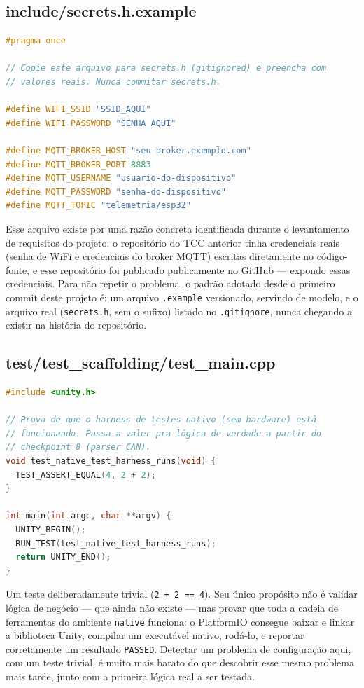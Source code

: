 \documentclass[11pt,a4paper]{article}
\begin{document}
\subsection{include/secrets.h.example}

\begin{lstlisting}[language=Cpp,caption={firmware/include/secrets.h.example}]
#pragma once

// Copie este arquivo para secrets.h (gitignored) e preencha com
// valores reais. Nunca commitar secrets.h.

#define WIFI_SSID "SSID_AQUI"
#define WIFI_PASSWORD "SENHA_AQUI"

#define MQTT_BROKER_HOST "seu-broker.exemplo.com"
#define MQTT_BROKER_PORT 8883
#define MQTT_USERNAME "usuario-do-dispositivo"
#define MQTT_PASSWORD "senha-do-dispositivo"
#define MQTT_TOPIC "telemetria/esp32"
\end{lstlisting}

Esse arquivo existe por uma razão concreta identificada durante o levantamento de requisitos do projeto: o repositório do TCC anterior tinha credenciais reais (senha de WiFi e credenciais do broker MQTT) escritas diretamente no código-fonte, e esse repositório foi publicado publicamente no GitHub --- expondo essas credenciais. Para não repetir o problema, o padrão adotado desde o primeiro commit deste projeto é: um arquivo \texttt{.example} versionado, servindo de modelo, e o arquivo real (\texttt{secrets.h}, sem o sufixo) listado no \texttt{.gitignore}, nunca chegando a existir na história do repositório.

\subsection{test/test\_scaffolding/test\_main.cpp}

\begin{lstlisting}[language=Cpp,caption={firmware/test/test\_scaffolding/test\_main.cpp}]
#include <unity.h>

// Prova de que o harness de testes nativo (sem hardware) está
// funcionando. Passa a valer pra lógica de verdade a partir do
// checkpoint 8 (parser CAN).
void test_native_test_harness_runs(void) {
  TEST_ASSERT_EQUAL(4, 2 + 2);
}

int main(int argc, char **argv) {
  UNITY_BEGIN();
  RUN_TEST(test_native_test_harness_runs);
  return UNITY_END();
}
\end{lstlisting}

Um teste deliberadamente trivial (\texttt{2 + 2 == 4}). Seu único propósito não é validar lógica de negócio --- que ainda não existe --- mas provar que toda a cadeia de ferramentas do ambiente \texttt{native} funciona: o PlatformIO consegue baixar e linkar a biblioteca Unity, compilar um executável nativo, rodá-lo, e reportar corretamente um resultado \texttt{PASSED}. Detectar um problema de configuração aqui, com um teste trivial, é muito mais barato do que descobrir esse mesmo problema mais tarde, junto com a primeira lógica real a ser testada.
\end{document}
